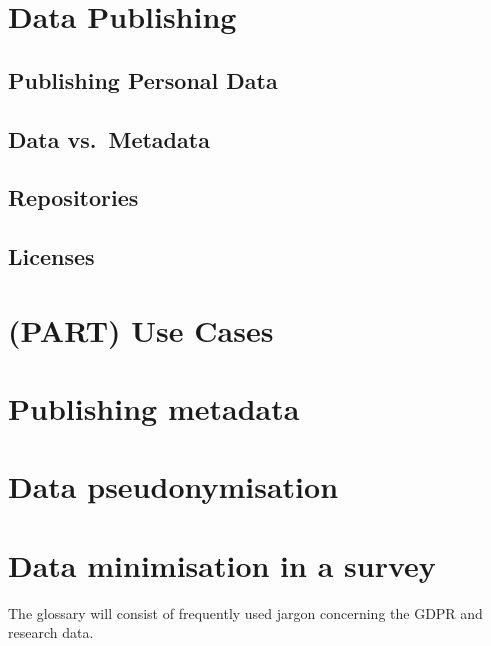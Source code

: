 \documentclass[
]{book}
\begin{document}
\hypertarget{data-publishing}{%
\chapter{Data Publishing}\label{data-publishing}}

\hypertarget{publishing-personal-data}{%
\section{Publishing Personal Data}\label{publishing-personal-data}}

\hypertarget{data-vs.-metadata}{%
\section{Data vs.~Metadata}\label{data-vs.-metadata}}

\hypertarget{repositories}{%
\section{Repositories}\label{repositories}}

\hypertarget{licenses}{%
\section{Licenses}\label{licenses}}

\hypertarget{part-use-cases}{%
\chapter{(PART) Use Cases}\label{part-use-cases}}

\hypertarget{open-science-questionnaire}{%
\chapter{Publishing metadata}\label{open-science-questionnaire}}

\hypertarget{youth-pseudonymisation}{%
\chapter{Data pseudonymisation}\label{youth-pseudonymisation}}

\hypertarget{pet-survey}{%
\chapter{Data minimisation in a survey}\label{pet-survey}}

The glossary will consist of frequently used jargon concerning the GDPR and research data.

  
\end{document}
